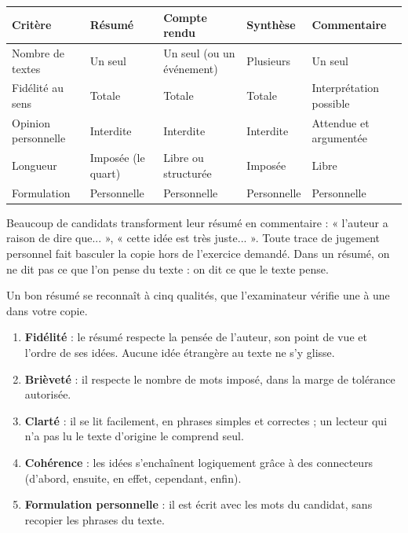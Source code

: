 \documentclass[11pt]{article}
\newcounter{popsec}
\newcounter{popsub}
\newcommand{\courssub}[1]{%
  \stepcounter{popsub}%
  \par\vspace{9pt}\noindent{\popxbold\fontsize{11.5}{13}\selectfont\color{popink}{\color{poporange}\thepopsec.\thepopsub}\hspace{6pt}#1}\par\nopagebreak\vspace{4pt}
}
\begin{document}
\begin{center}
\begin{tabularx}{\linewidth}{|l|X|X|X|X|}
\hline
\rowcolor{popblueL} \textbf{Critère} & \textbf{Résumé} & \textbf{Compte rendu} & \textbf{Synthèse} & \textbf{Commentaire} \\
\hline
Nombre de textes & Un seul & Un seul (ou un événement) & Plusieurs & Un seul \\
\hline
Fidélité au sens & Totale & Totale & Totale & Interprétation possible \\
\hline
Opinion personnelle & Interdite & Interdite & Interdite & Attendue et argumentée \\
\hline
Longueur & Imposée (le quart) & Libre ou structurée & Imposée & Libre \\
\hline
Formulation & Personnelle & Personnelle & Personnelle & Personnelle \\
\hline
\end{tabularx}
\end{center}

\begin{attention}
Beaucoup de candidats transforment leur résumé en commentaire : « l'auteur a raison de dire que... », « cette idée est très juste... ». Toute trace de jugement personnel fait basculer la copie hors de l'exercice demandé. Dans un résumé, on ne dit pas ce que l'on pense du texte : on dit ce que le texte pense.
\end{attention}

\courssub{Les qualités d'un bon résumé}

Un bon résumé se reconnaît à cinq qualités, que l'examinateur vérifie une à une dans votre copie.

\begin{aretenir}
\begin{enumerate}
\item \textbf{Fidélité} : le résumé respecte la pensée de l'auteur, son point de vue et l'ordre de ses idées. Aucune idée étrangère au texte ne s'y glisse.
\item \textbf{Brièveté} : il respecte le nombre de mots imposé, dans la marge de tolérance autorisée.
\item \textbf{Clarté} : il se lit facilement, en phrases simples et correctes ; un lecteur qui n'a pas lu le texte d'origine le comprend seul.
\item \textbf{Cohérence} : les idées s'enchaînent logiquement grâce à des connecteurs (d'abord, ensuite, en effet, cependant, enfin).
\item \textbf{Formulation personnelle} : il est écrit avec les mots du candidat, sans recopier les phrases du texte.
\end{enumerate}
\end{aretenir}
\end{document}
